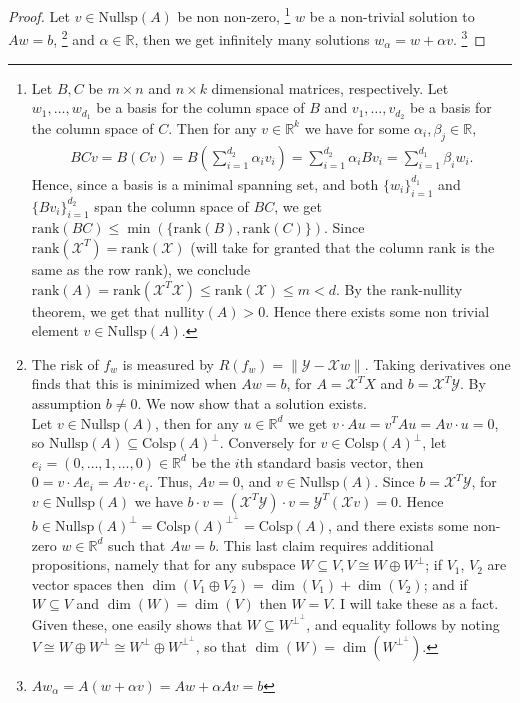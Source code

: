 \documentclass[12pt]{article}
\newcommand{\real}{\mathbb{R}}
\newcommand\set[1]{\{#1\}}
\newcommand\nullity{\text{nullity}}
\newcommand{\norm}[1]{\lVert #1 \rVert}
\newcommand{\X}{\mathcal{X}}
\newcommand{\Y}{\mathcal{Y}}
\newcommand{\colsp}{\text{Colsp}}
\newcommand{\nullsp}{\text{Nullsp}}
\newcommand{\rk}{\text{rank}}
\begin{document}
\begin{proof}
  Let $v \in \nullsp(A)$ be non non-zero, 
  \footnote{Let $B, C$ be $m \times n$ and $n \times k$ dimensional matrices, respectively. Let $w_1, \dots, w_{d_1}$ be a basis for the column space of $B$ and $v_1, \dots, v_{d_2}$ be a basis for the column space of $C$. Then for any $v \in \real^k$ we have for some $\alpha_i, \beta_j \in \real,$
  \begin{align*}
    BCv = B(Cv) =  B(\sum\limits_{i=1}^{d_2}\alpha_iv_i) = \sum\limits_{i=1}^{d_2}\alpha_iBv_i = \sum\limits_{i=1}^{d_1}\beta_iw_i.
  \end{align*}
  Hence, since a basis is a minimal spanning set, and both $\set{w_i}_{i=1}^{d_1}$ and $\set{Bv_i}_{i=1}^{d_2}$  span the column space of $BC$, we get $\rk(BC) \leq \min(\set{\rk(B), \rk(C)})$. Since $\rk(\X^T) = \rk(\X)$ (will take for granted that the column rank is the same as the row rank), we conclude $\rk(A) = \rk(\X^T\X) \leq \rk(\X) \leq m < d$. By the rank-nullity theorem, we get that $\nullity(A)>0$. Hence there exists some non trivial element $ v \in \nullsp(A)$.
  }
  $w$ be a non-trivial solution to $Aw=b$,
  \footnote{
  The risk of $f_w$ is measured by $R(f_w) = \norm{\Y - \X w}$. Taking derivatives one finds that this is minimized when $Aw=b$, for $A=\X^T X$ and $b=\X^T \Y$. By assumption $b \not = 0$. We now show that a solution exists.\\
  Let $v \in \nullsp(A)$, then for any $u \in \real^d$ we get $v \cdot Au = v^T A u = Av \cdot u = 0$, so $\nullsp(A) \subseteq \colsp(A)^{\perp}$. Conversely for $v \in \colsp(A)^{\perp}$, let $e_i =(0, \dots, 1, \dots, 0) \in \real^d$ be the $i$th standard basis vector, then $0 = v \cdot Ae_i = Av \cdot e_i$. Thus, $Av = 0$, and $v \in \nullsp(A)$. Since $b=\X^T\Y$, for $v \in \nullsp(A)$ we have $b \cdot v = (\X^T \Y) \cdot v = \Y^T (\X v) = 0$. Hence $b \in \nullsp(A)^{\perp} = \colsp(A)^{\perp}^{\perp} = \colsp(A)$, and there exists some non-zero $w \in \real^d$ such that $Aw = b$. This last claim requires additional propositions, namely that for any subspace $W \subseteq V, V \cong W \oplus W^{\perp}$; if $V_1$, $V_2$ are vector spaces then $\dim(V_1 \oplus V_2)= \dim(V_1) + \dim(V_2)$; and if $W \subseteq V$ and $\dim(W) = \dim(V)$ then $W=V$. I will take these as a fact. Given these, one easily shows that $W \subseteq W^{\perp}^{\perp}$, and equality follows by noting $V \cong W \oplus W^{\perp} \cong W^{\perp} \oplus W^{\perp}^{\perp}$, so that $\dim(W) = \dim(W^{\perp}^{\perp})$.
  }
  and $\alpha \in \real$, then we get infinitely many solutions $w_{\alpha} = w + \alpha v$.
  \footnote{
  $Aw_{\alpha} = A(w + \alpha v) = Aw + \alpha Av = b$
  }
  
\end{proof}
\end{document}

